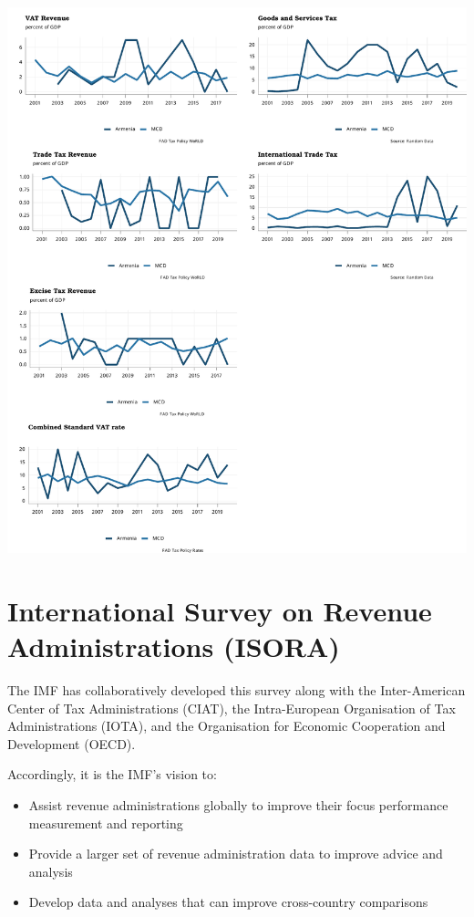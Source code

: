 \documentclass[
]{article}
\providecommand{\tightlist}{%
  \setlength{\itemsep}{0pt}\setlength{\parskip}{0pt}}
\begin{document}
\begin{center}\includegraphics{RandomData_MCD__files/figure-latex/weoInDirectTaxesLine-1} \end{center}

\newpage

\hypertarget{international-survey-on-revenue-administrations-isora}{%
\section{International Survey on Revenue Administrations
(ISORA)}\label{international-survey-on-revenue-administrations-isora}}

The IMF has collaboratively developed this survey along with the
Inter-American Center of Tax Administrations (CIAT), the Intra-European
Organisation of Tax Administrations (IOTA), and the Organisation for
Economic Cooperation and Development (OECD).

Accordingly, it is the IMF's vision to:

\begin{itemize}
\tightlist
\item
  Assist revenue administrations globally to improve their focus
  performance measurement and reporting
\item
  Provide a larger set of revenue administration data to improve advice
  and analysis
\item
  Develop data and analyses that can improve cross-country comparisons
\end{itemize}
\end{document}
